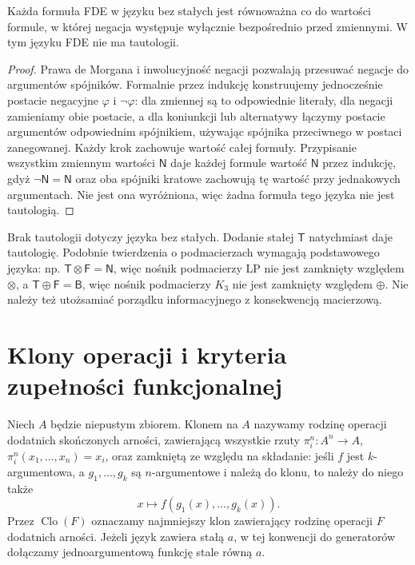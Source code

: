 \begin{wniosek}
\label{cor:ncl-four-nnf}
Każda formuła FDE w języku bez stałych jest równoważna
co do wartości formule, w której negacja występuje
wyłącznie bezpośrednio przed zmiennymi.
W tym języku FDE nie ma tautologii.
\end{wniosek}
\begin{proof}
Prawa de Morgana i inwolucyjność negacji pozwalają
przesuwać negacje do argumentów spójników.
Formalnie przez indukcję konstruujemy jednocześnie
postacie negacyjne $\varphi$ i $\neg\varphi$:
dla zmiennej są to odpowiednie literały, dla negacji
zamieniamy obie postacie, a dla koniunkcji lub alternatywy
łączymy postacie argumentów odpowiednim spójnikiem,
używając spójnika przeciwnego w postaci zanegowanej.
Każdy krok zachowuje wartość całej formuły.
Przypisanie wszystkim zmiennym wartości $\mathsf N$
daje każdej formule wartość $\mathsf N$ przez indukcję,
gdyż $\neg\mathsf N=\mathsf N$ oraz oba spójniki
kratowe zachowują tę wartość przy jednakowych
argumentach. Nie jest ona wyróżniona, więc żadna
formuła tego języka nie jest tautologią.
\end{proof}

\begin{uwaga}\label{rem:ncl-four-language}
Brak tautologii dotyczy języka bez stałych.
Dodanie stałej $\mathsf T$ natychmiast daje tautologię.
Podobnie twierdzenia o podmacierzach wymagają podstawowego
języka: np. $\mathsf T\otimes\mathsf F=\mathsf N$,
więc nośnik podmacierzy LP nie jest zamknięty względem
$\otimes$, a $\mathsf T\oplus\mathsf F=\mathsf B$,
więc nośnik podmacierzy $K_3$ nie jest zamknięty
względem $\oplus$.
Nie należy też utożsamiać porządku informacyjnego
z konsekwencją macierzową.
\end{uwaga}

\section{Klony operacji i kryteria zupełności funkcjonalnej}

\begin{definicja}\label{def:ncl-clone}
Niech $A$ będzie niepustym zbiorem. Klonem na $A$
nazywamy rodzinę operacji dodatnich skończonych arności,
zawierającą wszystkie rzuty $\pi_i^n:A^n\to A$,
$\pi_i^n(x_1,\ldots,x_n)=x_i$, oraz zamkniętą
ze względu na składanie: jeśli $f$ jest $k$-argumentowa,
a $g_1,\ldots,g_k$ są $n$-argumentowe i należą do klonu,
to należy do niego także
\[
 x\longmapsto f(g_1(x),\ldots,g_k(x)).
\]
Przez $\operatorname{Clo}(F)$ oznaczamy najmniejszy klon
zawierający rodzinę operacji $F$ dodatnich arności.
Jeżeli język zawiera stałą $a$, w tej konwencji
do generatorów dołączamy jednoargumentową funkcję
stale równą $a$.
\end{definicja}

